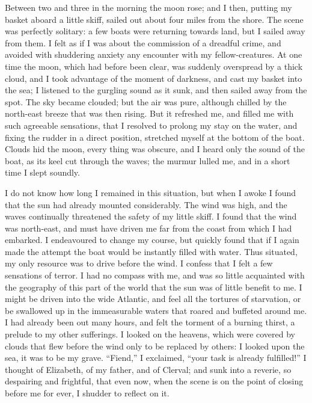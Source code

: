 Between two and three in the morning
the moon rose; and I then, putting
my basket aboard a little skiff, sailed
out about four miles from the shore.
The scene was perfectly solitary: a few
boats were returning towards land, but
I sailed away from them. I felt as if
I was about the commission of a dreadful
crime, and avoided with shuddering
anxiety any encounter with my fellow-creatures.
At one time the moon,
which had before been clear, was suddenly
overspread by a thick cloud, and
I took advantage of the moment of
darkness, and cast my basket into the
sea; I listened to the gurgling sound
as it sunk, and then sailed away from
the spot. The sky became clouded;
but the air was pure, although chilled
by the north-east breeze that was then
rising. But it refreshed me, and filled
me with such agreeable sensations, that
I resolved to prolong my stay on the
water, and fixing the rudder in a direct
position, stretched myself at the bottom
of the boat. Clouds hid the moon,
every thing was obscure, and I heard
only the sound of the boat, as its keel
cut through the waves; the murmur
lulled me, and in a short time I slept
soundly.

I do not know how long I remained
in this situation, but when I awoke I
found that the sun had already mounted
considerably. The wind was high, and
the waves continually threatened the
safety of my little skiff. I found that
the wind was north-east, and must have
driven me far from the coast from
which I had embarked. I endeavoured
to change my course, but quickly found
that if I again made the attempt the
boat would be instantly filled with
water. Thus situated, my only resource
was to drive before the wind. I confess
that I felt a few sensations of terror. I
had no compass with me, and was so
little acquainted with the geography
of this part of the world that the sun
was of little benefit to me. I might
be driven into the wide Atlantic, and
feel all the tortures of starvation, or be
swallowed up in the immeasurable
waters that roared and buffeted around
me. I had already been out many
hours, and felt the torment of a burning
thirst, a prelude to my other sufferings.
I looked on the heavens, which were
covered by clouds that flew before the
wind only to be replaced by others: I
looked upon the sea, it was to be my
grave. ``Fiend,'' I exclaimed, ``your
task is already fulfilled!'' I thought of
Elizabeth, of my father, and of Clerval;
and sunk into a reverie, so despairing
and frightful, that even now, when the
scene is on the point of closing before
me for ever, I shudder to reflect on it.

